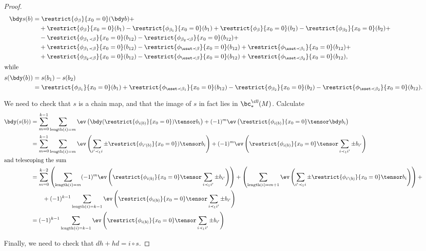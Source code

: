 \begin{proof}
\begin{align*}
\bdy s(b) & =  \restrict{\phi_{\beta}}{x_0 = 0}(\bdy b) + \\
	& \quad + \restrict{\phi_{\beta}}{x_0 = 0}(b_1) - \restrict{\phi_{\beta_1}}{x_0 = 0}(b_1) + \restrict{\phi_{\beta}}{x_0 = 0}(b_2) - \restrict{\phi_{\beta_2}}{x_0 = 0}(b_2) + \\
	& \quad - \restrict{\phi_{\beta_1 \prec \beta}}{x_0 = 0}(b_{12}) - \restrict{\phi_{\beta_2 \prec \beta}}{x_0 = 0}(b_{12}) + \\
	& \quad + \restrict{\phi_{\beta_1 \prec \beta}}{x_0 = 0}(b_{12}) - \restrict{\phi_{\eset  \prec \beta}}{x_0 = 0}(b_{12}) + \restrict{\phi_{\eset \prec \beta_1}}{x_0 = 0}(b_{12}) + \\
	& \quad + \restrict{\phi_{\beta_2 \prec \beta}}{x_0 = 0}(b_{12}) - \restrict{\phi_{\eset \prec \beta}}{x_0 = 0}(b_{12}) + \restrict{\phi_{\eset \prec \beta_2}}{x_0 = 0}(b_{12}), \\ 
\intertext{while}
s(\bdy(b)) & = s(b_1) - s(b_2) \\
		& = \restrict{\phi_{\beta_1}}{x_0=0}(b_1) + \restrict{\phi_{\eset \prec \beta_1}}{x_0=0}(b_{12}) - \restrict{\phi_{\beta_2}}{x_0=0}(b_2) - \restrict{\phi_{\eset \prec \beta_2}}{x_0=0}(b_{12}) .
\end{align*}

We need to check that $s$ is a chain map, and that \todo{} the image of $s$ in fact lies in $\bc^{\cU}_*(M)$.  Calculate
\begin{align*}
\bdy(s(b)) & = \sum_{m=0}^{k-1} \sum_{\length{i}=m} \ev\left(\bdy(\restrict{\phi_{i(b)}}{x_0 = 0})\tensor b_i\right) + (-1)^m \ev\left(\restrict{\phi_{i(b)}}{x_0 = 0} \tensor \bdy b_i\right) \\
                & = \sum_{m=0}^{k-1} \sum_{\length{i}=m} \ev\left(\sum_{i' \prec_1 i} \pm \restrict{\phi_{i'(b)}}{x_0 = 0})\tensor b_i\right) + (-1)^m \ev\left(\restrict{\phi_{i(b)}}{x_0 = 0}\tensor \sum_{i \prec_1 i'} \pm b_{i'}\right) \\
\intertext{and telescoping the sum}
		& = \sum_{m=0}^{k-2} \left(\sum_{\length{i}=m}  (-1)^m \ev\left(\restrict{\phi_{i(b)}}{x_0 = 0} \tensor \sum_{i \prec_1 i'} \pm b_{i'}\right) \right) + \left(\sum_{\length{i}=m+1} \ev\left(\sum_{i' \prec_1 i} \pm \restrict{\phi_{i'(b)}}{x_0 = 0} \tensor b_i\right) \right) + \\
		& \qquad + (-1)^{k-1} \sum_{\length{i}=k-1} \ev\left(\restrict{\phi_{i(b)}}{x_0 = 0} \tensor \sum_{i \prec_1 i'} \pm b_{i'}\right) \\
		& = (-1)^{k-1} \sum_{\length{i}=k-1} \ev\left(\restrict{\phi_{i(b)}}{x_0 = 0} \tensor \sum_{i \prec_1 i'} \pm b_{i'}\right)
\end{align*}

Finally, we need to check that $dh+hd=i\circ s$. \todo{}
\end{proof}
